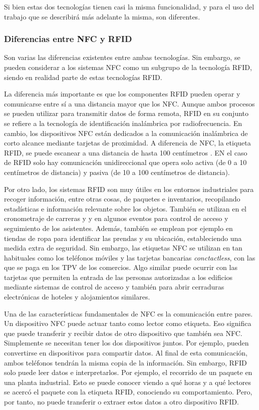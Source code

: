 \documentclass[12pt,a4paper,onecolumn,oneside]{report}
\begin{document}
Si bien estas dos tecnologías tienen casi la misma funcionalidad, y para el uso del trabajo que se describirá más adelante la misma, son diferentes. 


\subsubsection{Diferencias entre NFC y RFID}
\label{Diferencias entre NFC y RFID}

Son varias las diferencias existentes entre ambas tecnologías. Sin embargo, se pueden considerar a los sistemas NFC como un subgrupo de la tecnología RFID, siendo en realidad parte de estas tecnologías RFID.

La diferencia más importante es que los componentes RFID pueden operar y comunicarse entre sí a una distancia mayor que los NFC. Aunque ambos procesos se pueden utilizar para transmitir datos de forma remota, RFID en su conjunto se refiere a la tecnología de identificación inalámbrica por radiofrecuencia. En cambio, los dispositivos NFC están dedicados a la comunicación inalámbrica de corto alcance mediante tarjetas de proximidad. A diferencia de NFC, la etiqueta RFID, se puede escanear a una distancia de hasta 100 centímetros \cite{dos}. EN el caso de RFID solo hay comunicación unidireccional que opera solo activa (de 0 a 10 centímetros de distancia) y pasiva (de 10 a 100 centímetros de distancia).

Por otro lado, los sistemas RFID son muy útiles en los entornos industriales para recoger información, entre otras cosas, de paquetes e inventarios, recopilando estadísticas e información relevante sobre los objetos. También se utilizan en el cronometraje de carreras y y en algunos eventos para control de acceso y seguimiento de los asistentes. Además, también se emplean por ejemplo en tiendas de ropa para identificar las prendas y su ubicación, estableciendo una medida extra de seguridad. Sin embargo, las etiquetas NFC se utilizan en tan habituales como los teléfonos móviles y las tarjetas bancarias \textit{conctactless}, con las que se paga en los TPV de los comercios. Algo similar puede ocurrir con las tarjetas que permiten la entrada de las personas autorizadas a los edificios mediante sistemas de control de acceso y también para abrir cerraduras electrónicas de hoteles y alojamientos similares.

Una de las características fundamentales de NFC es la comunicación entre pares. Un dispositivo NFC puede actuar tanto como lector como etiqueta. Eso significa que puede transferir y recibir datos de otro dispositivo que también sea NFC. Simplemente se necesitan tener los dos dispositivos juntos. Por ejemplo, pueden convertirse en dispositivos para compartir datos. Al final de esta comunicación, ambos teléfonos tendrán la misma copia de la información. Sin embargo, RFID solo puede leer datos e interpretarlos. Por ejemplo, el recorrido de un paquete en una planta industrial. Esto se puede conocer viendo a qué horas y a qué lectores se acercó el paquete con la etiqueta RFID, conociendo su comportamiento. Pero, por tanto, no puede transferir o extraer estos datos a otro dispositivo RFID.
\end{document}
